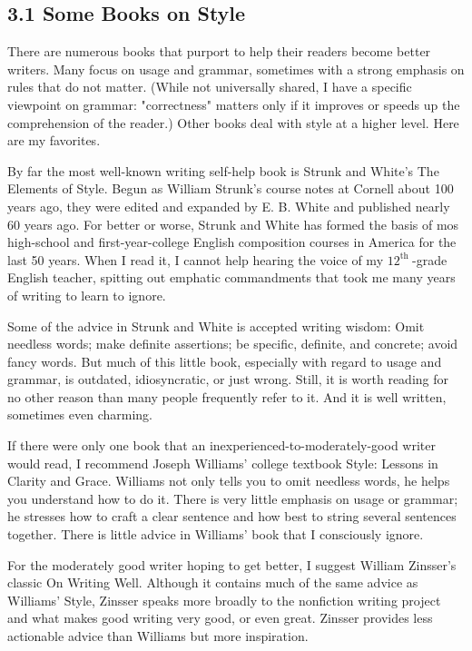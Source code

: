 \subsection*{3.1 Some Books on Style}
There are numerous books that purport to help their readers become better writers. Many focus on usage and grammar, sometimes with a strong emphasis on rules that do not matter. (While not universally shared, I have a specific viewpoint on grammar: "correctness" matters only if it improves or speeds up the comprehension of the reader.) Other books deal with style at a higher level. Here are my favorites.

By far the most well-known writing self-help book is Strunk and White's The Elements of Style. Begun as William Strunk's course notes at Cornell about 100 years ago, they were edited and expanded by E. B. White and published nearly 60 years ago. For better or worse, Strunk and White has formed the basis of mos high-school and first-year-college English composition courses in America for the last 50 years. When I read it, I cannot help hearing the voice of my $12^{\text{th }}$-grade English teacher, spitting out emphatic commandments that took me many years of writing to learn to ignore.

Some of the advice in Strunk and White is accepted writing wisdom: Omit needless words; make definite assertions; be specific, definite, and concrete; avoid fancy words. But much of this little book, especially with regard to usage and grammar, is outdated, idiosyncratic, or just wrong. Still, it is worth reading for no other reason than many people frequently refer to it. And it is well written, sometimes even charming.

If there were only one book that an inexperienced-to-moderately-good writer would read, I recommend Joseph Williams' college textbook Style: Lessons in Clarity and Grace. Williams not only tells you to omit needless words, he helps you understand how to do it. There is very little emphasis on usage or grammar; he stresses how to craft a clear sentence and how best to string several sentences together. There is little advice in Williams' book that I consciously ignore.

For the moderately good writer hoping to get better, I suggest William Zinsser's classic On Writing Well. Although it contains much of the same advice as Williams' Style, Zinsser speaks more broadly to the nonfiction writing project and what makes good writing very good, or even great. Zinsser provides less actionable advice than Williams but more inspiration.

